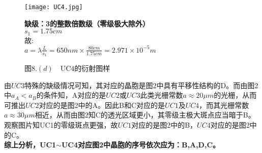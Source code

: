\documentclass{ctexart}
\begin{document}
\begin{figure}[H]
  \begin{minipage}[c]{0.43\linewidth}
    \texttt{[image: UC4.jpg]}
    \caption*{图$8.(d)\quad \mathrm{UC4}$的衍射图样}
    \end{minipage}
    \hspace{1.2cm}
    \begin{minipage}[c]{0.6\linewidth}
      \noindent \textbf{缺级：3的整数倍数级（零级极大除外）}\\
     $s_1=1.75cm$\\
      故:\\
      $a=\lambda\frac{L}{s_1}=650nm\times \frac{80cm}{1.75cm}=2.971\times 10^{-5}m$
    \end{minipage}
\end{figure}
由$UC3$特殊的缺级情况可知，其对应的晶胞是图2中具有平移性结构的D。而由图2中$a_A<a_B$的条件知，A对应的是$UC2$或$UC3$此类光栅常数$a\approx 20\mu m$的光栅，从而可推出$UC2$对应的是图2中的A。因此B和C对应的是$UC1$及$UC4$，而其光栅常数$a\approx 30\mu m$相近，从而由图2知C的透光区域更小，其零级主极大斑点应当暗于B。观察图片知UC1的零级斑点更强，故$UC1$对应的是图2中的B，$UC4$对应的是图2中的C。\\

\textbf{综上分析，UC1$\sim $UC4对应图2中晶胞的序号依次应为：B,A,D,C。}

\clearpage
\end{document}
